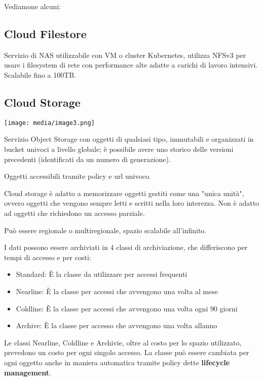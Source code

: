 Vediamone alcuni:

\subsection{Cloud Filestore}\label{cloud-filestore}

Servizio di NAS utilizzabile con VM o cluster Kubernetes, utilizza NFSv3
per usare i filesystem di rete con performance alte adatte a carichi di
lavoro intensivi. Scalabile fino a 100TB.

\subsection{Cloud Storage}\label{cloud-storage}

\texttt{[image: media/image3.png]}

Servizio Object Storage con oggetti di qualsiasi tipo, immutabili e
organizzati in bucket univoci a livello globale; è possibile avere uno
storico delle versioni precedenti (identificati da un numero di
generazione).

Oggetti accessibili tramite policy e url univoco.

Cloud storage è adatto a memorizzare oggetti gestiti come una "unica
unità", ovvero oggetti che vengono sempre letti e scritti nella loro
interezza. Non è adatto ad oggetti che richiedono un accesso parziale.

Può essere regionale o multiregionale, spazio scalabile all'infinito.

I dati possono essere archiviati in 4 classi di archiviazione, che
differiscono per tempi di accesso e per costi:

\begin{itemize}
\item
  Standard: È la classe da utilizzare per accessi frequenti
\item
  Nearline: È la classe per accessi che avvengono una volta al mese
\item
  Coldline: È la classe per accessi che avvengono una volta ogni 90
  giorni
\item
  Archive: È la classe per accesso che avvengono una volta
  all\textquotesingle anno
\end{itemize}

Le classi Nearline, Coldline e Archivie, oltre al costo per lo spazio
utilizzato, prevedono un costo per ogni singolo accesso. La classe può
essere cambiata per ogni oggetto anche in maniera automatica tramite
policy dette \textbf{lifecycle management}.

